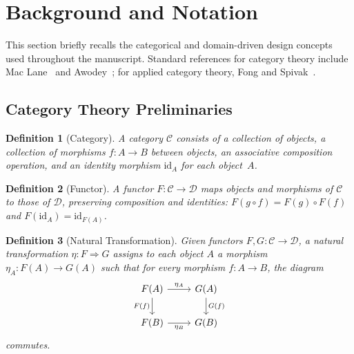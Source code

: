 \documentclass[11pt,a4paper]{article}
\newtheorem{definition}{Definition}[section]
\begin{document}
\section{Background and Notation}
\label{sec:background}

This section briefly recalls the categorical and domain-driven design concepts
used throughout the manuscript. Standard references for category theory
include Mac Lane~\citep{maclane1998} and Awodey~\citep{awodey2010}; for
applied category theory, Fong and Spivak~\citep{fongspivak2019}.

\subsection{Category Theory Preliminaries}
\label{sec:ct-prelim}

\begin{definition}[Category]
A \emph{category} $\mathcal{C}$ consists of a collection of objects, a
collection of morphisms $f:A\to B$ between objects, an associative
composition operation, and an identity morphism $\mathrm{id}_A$ for
each object~$A$.
\end{definition}

\begin{definition}[Functor]
A \emph{functor} $F:\mathcal{C}\to\mathcal{D}$ maps objects and
morphisms of $\mathcal{C}$ to those of $\mathcal{D}$, preserving
composition and identities: $F(g\circ f)=F(g)\circ F(f)$ and
$F(\mathrm{id}_A)=\mathrm{id}_{F(A)}$.
\end{definition}

\begin{definition}[Natural Transformation]
Given functors $F,G:\mathcal{C}\to\mathcal{D}$, a \emph{natural
transformation} $\eta:F\Rightarrow G$ assigns to each object $A$ a
morphism $\eta_A:F(A)\to G(A)$ such that for every morphism
$f:A\to B$, the diagram
\[
\begin{tikzcd}
  F(A) \ar[r, "\eta_A"] \ar[d, "F(f)"'] & G(A) \ar[d, "G(f)"] \\
  F(B) \ar[r, "\eta_B"'] & G(B)
\end{tikzcd}
\]
commutes.
\end{definition}
\end{document}
